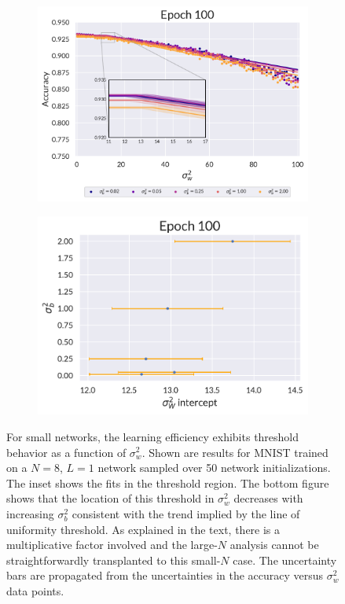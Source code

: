 \begin{figure}[H]
	\centering
	\begin{subfigure}[t]{0.5\textwidth}
		\includegraphics[width=\textwidth]{figures/chapter4/shallowNetworkSlope.pdf}
	\end{subfigure}%
	\begin{subfigure}[t]{0.5\textwidth}
		\includegraphics[width=\textwidth]{figures/chapter4/shallowNetworkSlopeIntercept.pdf}
	\end{subfigure}
	\caption{For small networks, the learning efficiency exhibits threshold behavior as a function of $\sigma_w^2$. Shown are results for MNIST trained on a $N=8$, $L=1$ network sampled over 50 network initializations. The inset shows the fits in the threshold region. The bottom figure shows that the location of this threshold in $\sigma_{w}^{2}$ decreases with increasing $\sigma_b^2$ consistent with the trend implied by the line of uniformity threshold. As explained in the text, there is a multiplicative factor involved and the large-$N$ analysis cannot be straightforwardly transplanted to this small-$N$ case. The uncertainty bars are propagated from the uncertainties in the accuracy versus $\sigma_{w}^{2}$ data points.}
	\label{fig:LOU-threshold}
\end{figure}

